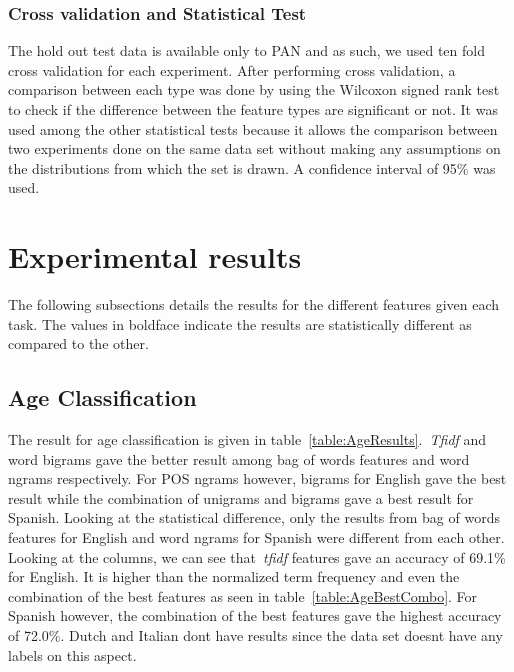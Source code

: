 \documentclass[a4paper]{llncs}
\begin{document}
\subsubsection{Cross validation and Statistical Test}
The hold out test data is available only to PAN and as such, we used ten fold cross validation for each experiment. After performing cross validation, a comparison between each type was done by using the Wilcoxon signed rank test~\cite{wilcoxon1945individual} to check if the difference between the feature types are significant or not. It was used among the other statistical tests because it allows the comparison between two experiments done on the same data set without making any assumptions on the distributions from which the set is drawn. A confidence interval of 95\% was used.


\section{Experimental results}
The following subsections details the results for the different features given each task. The values in boldface indicate the results are statistically different as compared to the other. 

\subsection{Age Classification}
The result for age classification is given in table~\ref{table:AgeResults}.~\textit{Tfidf} and word bigrams gave the better result among bag of words features and word ngrams respectively. For POS ngrams however, bigrams for English gave the best result while the combination of unigrams and bigrams gave a best result for Spanish. Looking at the statistical difference, only the results from bag of words features for English and word ngrams for Spanish were different from each other. Looking at the columns, we can see that~\textit{tfidf} features gave an accuracy of 69.1\% for English. It is higher than the normalized term frequency and even the combination of the best features as seen in table~\ref{table:AgeBestCombo}. For Spanish however, the combination of the best features gave the highest accuracy of 72.0\%. Dutch and Italian dont have results since the data set doesnt have any labels on this aspect. 
\end{document}
